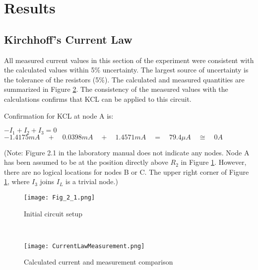 \documentclass[12pt]{article}
\begin{document}

\section{Results}
\subsection{Kirchhoff's Current Law}
All measured current values in this section of the experiment were consistent with the calculated 
values within 5\% uncertainty. The largest source of uncertainty is the tolerance of the resistors 
(5\%). The calculated and measured quantities are summarized in Figure \ref{fig.Current}.
The consistency of the measured values with the calculations confirms that KCL can be applied 
to this circuit.

Confirmation for KCL at node A is:
\begin{center}
	$-{ I }_{ 1 }+{ I }_{ 2 }+{ I }_{ 3 }=0$\\
	$-1.4175mA\quad +\quad 0.0398mA\quad +\quad 1.4571mA\quad =\quad 79.4\mu A\quad \cong \quad 0A$\\[1em]
\end{center}

(Note: Figure 2.1 in 
the laboratory manual does not indicate any nodes. Node A has been assumed to be at the 
position directly above ${R}_{2}$ in Figure \ref{fig.setup}. However, there are no logical locations for nodes B or 
C. The upper right corner of Figure \ref{fig.setup}, where ${I}_{3}$ joins ${I}_{L}$ is a trivial node.)
\begin{figure}[htbp]
\centering
\texttt{[image: Fig\_2\_1.png]}
\caption{Initial circuit setup}
\label{fig.setup}
\end{figure}\\
\begin{figure}[htbp]
	\centering
	\texttt{[image: CurrentLawMeasurement.png]}
	\caption{Calculated current and measurement comparison}
	\label{fig.Current}
\end{figure}
\end{document}
